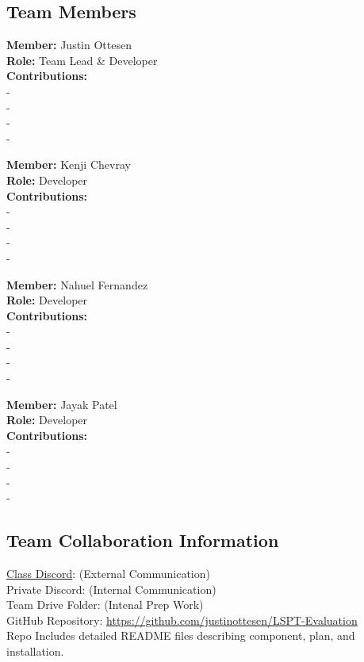 \subsection*{Team Members}

\textbf{Member:} Justin Ottesen \\
\smallskip\textbf{Role:} Team Lead \& Developer \\
\smallskip\textbf{Contributions:}
\\- 
\\- 
\\- 
\\- 

\bigskip\textbf{Member:} Kenji Chevray \\
\smallskip\textbf{Role:} Developer \\
\smallskip\textbf{Contributions:}
\\- 
\\- 
\\- 
\\- 

\bigskip\textbf{Member:} Nahuel Fernandez \\
\smallskip\textbf{Role:} Developer \\
\smallskip\textbf{Contributions:}
\\- 
\\- 
\\- 
\\- 

\bigskip\textbf{Member:} Jayak Patel \\
\smallskip\textbf{Role:} Developer \\
\smallskip\textbf{Contributions:}
\\- 
\\- 
\\- 
\\- 

\subsection*{Team Collaboration Information}
\href{https://discord.gg/pMyXUx2X}{Class Discord}: (External Communication)
\\Private Discord: (Internal Communication)
\\Team Drive Folder: (Intenal Prep Work)
\\GitHub Repository: \url{https://github.com/justinottesen/LSPT-Evaluation} 
\\Repo Includes detailed README files describing component, plan, and installation.


